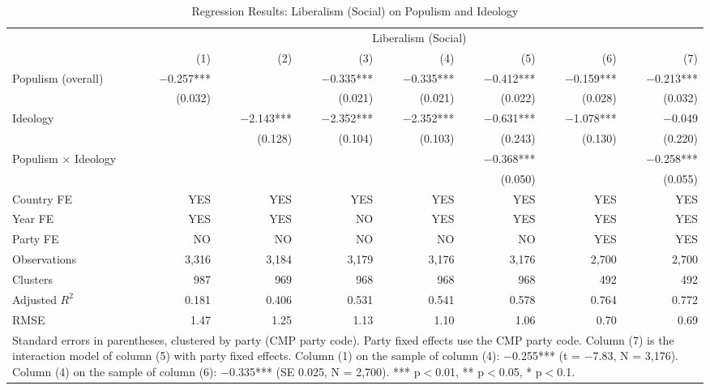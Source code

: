 \begin{table}
\caption{Regression Results: Liberalism (Social) on Populism and Ideology}
\label{tab:6}
\scriptsize\setlength{\tabcolsep}{4pt}
\centering
\begin{tabular}{lrrrrrrr}
\toprule
 & \multicolumn{7}{c}{Liberalism (Social)} \\
 & (1) & (2) & (3) & (4) & (5) & (6) & (7) \\
 \midrule
Populism (overall) & $-$0.257*** &  & $-$0.335*** & $-$0.335*** & $-$0.412*** & $-$0.159*** & $-$0.213*** \\
& (0.032) &  & (0.021) & (0.021) & (0.022) & (0.028) & (0.032) \\
Ideology &  & $-$2.143*** & $-$2.352*** & $-$2.352*** & $-$0.631*** & $-$1.078*** & $-$0.049 \\
&  & (0.128) & (0.104) & (0.103) & (0.243) & (0.130) & (0.220) \\
Populism $\times$ Ideology &  &  &  &  & $-$0.368*** &  & $-$0.258*** \\
&  &  &  &  & (0.050) &  & (0.055) \\
\midrule
Country FE & YES & YES & YES & YES & YES & YES & YES\\
Year FE & YES & YES & NO & YES & YES & YES & YES\\
Party FE & NO & NO & NO & NO & NO & YES & YES\\
Observations & 3,316 & 3,184 & 3,179 & 3,176 & 3,176 & 2,700 & 2,700 \\
Clusters & 987 & 969 & 968 & 968 & 968 & 492 & 492 \\
Adjusted $R^2$ & 0.181 & 0.406 & 0.531 & 0.541 & 0.578 & 0.764 & 0.772 \\
RMSE & 1.47 & 1.25 & 1.13 & 1.10 & 1.06 & 0.70 & 0.69 \\
\bottomrule
\multicolumn{8}{p{0.9\linewidth}}{\scriptsize Standard errors in parentheses, clustered by party (CMP party code). Party fixed effects use the CMP party code. Column (7) is the interaction model of column (5) with party fixed effects. Column (1) on the sample of column (4): $-$0.255*** (t = $-$7.83, N = 3,176). Column (4) on the sample of column (6): $-$0.335*** (SE 0.025, N = 2,700). *** p$<$0.01, ** p$<$0.05, * p$<$0.1.} \\
\end{tabular}
\end{table}
